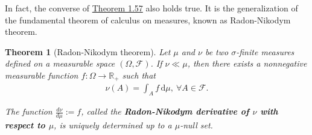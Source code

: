 \documentclass{article}
\numberwithin{equation}{section}
\renewcommand{\d}{\mathrm{d}}
\theoremstyle{plain}
\newtheorem{theorem}{Theorem}[section]
\theoremstyle{definition}
\begin{document}
In fact, the converse of \hyperref[thm:1.57]{Theorem 1.57} also holds true. It is the generalization of the fundamental theorem of calculus on measures, known as Radon-Nikodym theorem.

\begin{theorem}[Radon-Nikodym theorem]\label{thm:1.58} Let $\mu$ and $\nu$ be two $\sigma$-finite measures defined on a measurable space $(\Omega,\mathscr{F})$. If $\nu\ll\mu$, then there exists a nonnegative measurable function $f:\Omega\to\mathbb{R}_+$ such that
\begin{align*}
	\nu(A)=\int_A f\,\d \mu,\ \forall A\in\mathscr{F}.
\end{align*}

The function $\frac{d\nu}{d\mu}:=f$, called the \textbf{Radon-Nikodym derivative of $\nu$ with respect to $\mu$}, is uniquely determined up to a $\mu$-null set.
\end{theorem}
\end{document}
